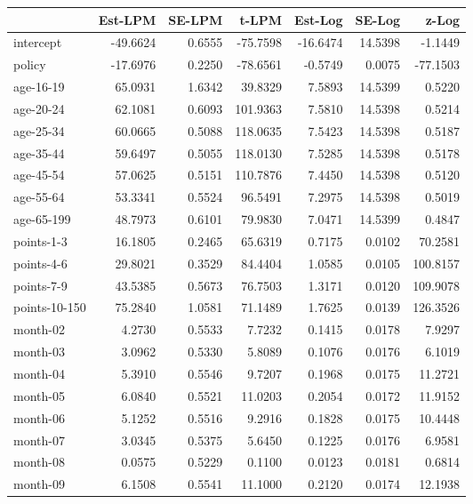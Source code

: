 \documentclass[10pt]{article}
\begin{document}
\begin{table}[ht]
\centering
\begin{tabular}{lrrrrrr}
  \hline
 & Est-LPM & SE-LPM & t-LPM & Est-Log & SE-Log & z-Log \\ 
  \hline
intercept & -49.6624 & 0.6555 & -75.7598 & -16.6474 & 14.5398 & -1.1449 \\ 
  policy & -17.6976 & 0.2250 & -78.6561 & -0.5749 & 0.0075 & -77.1503 \\ 
  age-16-19 & 65.0931 & 1.6342 & 39.8329 & 7.5893 & 14.5399 & 0.5220 \\ 
  age-20-24 & 62.1081 & 0.6093 & 101.9363 & 7.5810 & 14.5398 & 0.5214 \\ 
  age-25-34 & 60.0665 & 0.5088 & 118.0635 & 7.5423 & 14.5398 & 0.5187 \\ 
  age-35-44 & 59.6497 & 0.5055 & 118.0130 & 7.5285 & 14.5398 & 0.5178 \\ 
  age-45-54 & 57.0625 & 0.5151 & 110.7876 & 7.4450 & 14.5398 & 0.5120 \\ 
  age-55-64 & 53.3341 & 0.5524 & 96.5491 & 7.2975 & 14.5398 & 0.5019 \\ 
  age-65-199 & 48.7973 & 0.6101 & 79.9830 & 7.0471 & 14.5399 & 0.4847 \\ 
  points-1-3 & 16.1805 & 0.2465 & 65.6319 & 0.7175 & 0.0102 & 70.2581 \\ 
  points-4-6 & 29.8021 & 0.3529 & 84.4404 & 1.0585 & 0.0105 & 100.8157 \\ 
  points-7-9 & 43.5385 & 0.5673 & 76.7503 & 1.3171 & 0.0120 & 109.9078 \\ 
  points-10-150 & 75.2840 & 1.0581 & 71.1489 & 1.7625 & 0.0139 & 126.3526 \\ 
  month-02 & 4.2730 & 0.5533 & 7.7232 & 0.1415 & 0.0178 & 7.9297 \\ 
  month-03 & 3.0962 & 0.5330 & 5.8089 & 0.1076 & 0.0176 & 6.1019 \\ 
  month-04 & 5.3910 & 0.5546 & 9.7207 & 0.1968 & 0.0175 & 11.2721 \\ 
  month-05 & 6.0840 & 0.5521 & 11.0203 & 0.2054 & 0.0172 & 11.9152 \\ 
  month-06 & 5.1252 & 0.5516 & 9.2916 & 0.1828 & 0.0175 & 10.4448 \\ 
  month-07 & 3.0345 & 0.5375 & 5.6450 & 0.1225 & 0.0176 & 6.9581 \\ 
  month-08 & 0.0575 & 0.5229 & 0.1100 & 0.0123 & 0.0181 & 0.6814 \\ 
  month-09 & 6.1508 & 0.5541 & 11.1000 & 0.2120 & 0.0174 & 12.1938 \\ 

\end{tabular}
\end{table}
\end{document}
